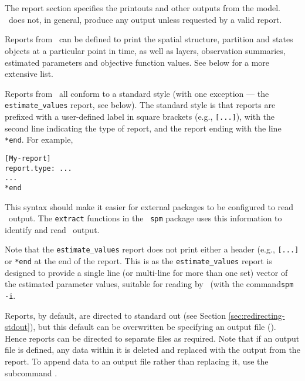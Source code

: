 \section{\label{sec:report-section}}

The report section specifies the printouts and other outputs from the model. \SPM\ does not, in general, produce any output unless requested by a valid report. 

Reports from \SPM\ can be defined to print the spatial structure, partition and states objects at a particular point in time, as well as layers, observation summaries, estimated parameters and objective function values. See below for a more extensive list.

Reports from \SPM\ all conform to a standard style (with one exception --- the \texttt{estimate\_values} report, see below). The standard style is that reports are prefixed with a user-defined label in square brackets (e.g., \texttt{[...]}), with the second line indicating the type of report, and the report ending with the line \texttt{*end}. For example,

\begin{verbatim} 
[My-report]
report.type: ...
...
*end
\end{verbatim}

This syntax should make it easier for external packages to be configured to read \SPM\ output. The \texttt{extract} functions in the \R\ \texttt{spm} package uses this information to identify and read \SPM\ output.

Note that the \texttt{estimate\_values} report does not print either a header (e.g., \texttt{[...]} or \texttt{*end} at the end of the report. This is as the \texttt{estimate\_values} report is designed to provide a single line (or multi-line for more than one set) vector of the estimated parameter values, suitable for reading by \SPM\ (with the command\texttt{spm -i}. 

Reports, by default, are directed to standard out (see Section \ref{sec:redirecting-stdout}), but this default can be overwritten be specifying an output file (). Hence reports can be directed to separate files as required. Note that if an output file is defined, any data within it is deleted and replaced with the output from the report. To append data to an output file rather than replacing it, use the subcommand .

